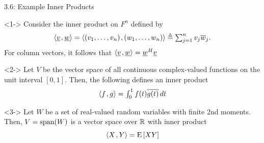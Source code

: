 \documentclass[10pt,letterpaper,english]{beamer}
\begin{document}
\begin{frame}{3.6: Example Inner Products}

\begin{example}<1->
Consider the inner product on $F^n$ defined by \vspace{-1.5mm}
\begin{equation*}
\inner{ \vecnot{v} }{ \vecnot{w} }
= \inner{ (v_1, \ldots, v_n) }{ (w_1, \ldots, w_n) }
\triangleq \textstyle\sum_{j=1}^n v_j \overline{w}_j. \vspace{-1.5mm}
\end{equation*}
For column vectors, it follows that $ {\left\langle  \underline{v}  \mskip2mu ,  \underline{w}  \right\rangle} = \underline{w}^H \underline{v} $
\end{example}

\begin{example}<2->
Let $V$ be the vector space of all continuous complex-valued functions on the unit interval $[0,1]$.
Then, the following defines an inner product \vspace{-1.5mm}
\begin{equation*}
{\left\langle  f  \mskip2mu ,  g  \right\rangle}
= \textstyle\int_0^1 f(t) \overline{g(t)} \, dt
\end{equation*}
\end{example}

\begin{example}<3->
Let $W$ be a set of real-valued random variables with finite 2nd moments.
Then, $V = \mathrm{span} (W)$ is a vector space over $\mathbb{R}$ with inner product \vspace{-1.5mm}
\[ {\left\langle  X  \mskip2mu ,  Y  \right\rangle} = \mathrm{E} \left[ XY \right] \]
\end{example}


\end{frame}
\end{document}
